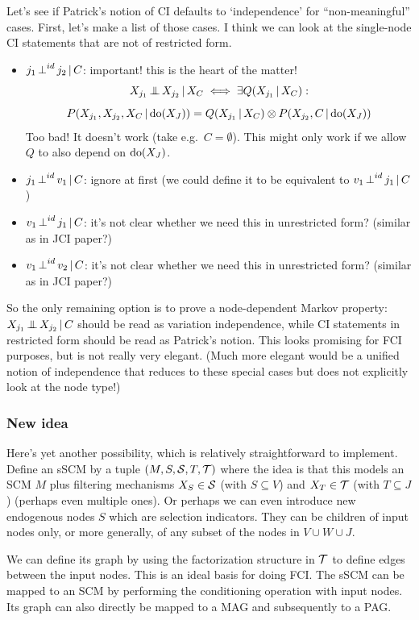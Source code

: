 Let's see if Patrick's notion of CI defaults to `independence' for ``non-meaningful'' cases. 
First, let's make a list of those cases.
I think we can look at the single-node CI statements that are not of restricted form.
\begin{itemize}
  \item $j_1 \operatorname*{\perp}^{id} j_2 \operatorname*{|} C$: important! this is the heart of the matter!
    $$X_{j_1} \operatorname*{\perp\mkern-11mu\perp} X_{j_2} \operatorname*{|} X_C \iff \exists Q(X_{j_1} \operatorname*{|} X_C):$$
    $$ P(X_{j_1},X_{j_2},X_C \operatorname*{|} \operatorname{do}(X_J)) = Q(X_{j_1} \operatorname*{|} X_C) \otimes P(X_{j_2},C \operatorname*{|} \operatorname{do}(X_J))$$
    Too bad! It doesn't work (take e.g.\ $C=\emptyset$).
    This might only work if we allow $Q$ to also depend on $\operatorname{do}(X_J)$.
  \item $j_1 \operatorname*{\perp}^{id} v_1 \operatorname*{|} C$: ignore at first (we could define it to be equivalent to $v_1 \operatorname*{\perp}^{id} j_1 \operatorname*{|} C$)
  \item $v_1 \operatorname*{\perp}^{id} j_1 \operatorname*{|} C$: it's not clear whether we need this in unrestricted form? (similar as in JCI paper?)
  \item $v_1 \operatorname*{\perp}^{id} v_2 \operatorname*{|} C$: it's not clear whether we need this in unrestricted form? (similar as in JCI paper?)
\end{itemize}

So the only remaining option is to prove a node-dependent Markov property:
$X_{j_1} \operatorname*{\perp\mkern-11mu\perp} X_{j_2} \operatorname*{|} C$ should be read as variation independence, while CI statements in restricted form should be read as Patrick's notion.
This looks promising for FCI purposes, but is not really very elegant.
(Much more elegant would be a unified notion of independence that reduces to these special cases but does not explicitly look at the node type!)

\subsubsection{New idea}

Here's yet another possibility, which is relatively straightforward to implement.
Define an sSCM by a tuple $\left ( M, S, \mathcal{S}, T, \mathcal{T} \right )$ where the idea is that this models an SCM $M$ plus filtering mechanisms $X_S \in \mathcal{S}$ (with $S \subseteq V$) and $X_T \in \mathcal{T}$ (with $T \subseteq J$) (perhaps even multiple ones).
Or perhaps we can even introduce new endogenous nodes $S$ which are selection indicators.
They can be children of input nodes only, or more generally, of any subset of the nodes in $V \cup W \cup J$.

We can define its graph by using the factorization structure in $\mathcal{T}$ to define edges between the input nodes.
This is an ideal basis for doing FCI.
The sSCM can be mapped to an SCM by performing the conditioning operation with input nodes.
Its graph can also directly be mapped to a MAG and subsequently to a PAG.
